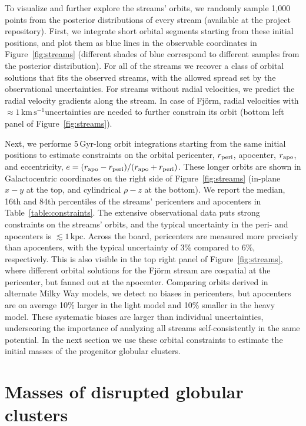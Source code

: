 \documentclass[twocolumn]{aastex63}
\newcommand{\kpc}{\ensuremath{\textrm{kpc}}}
\newcommand{\kms}{\ensuremath{\textrm{km}\,\textrm{s}^{-1}}}
\begin{document}
To visualize and further explore the streams' orbits, we randomly sample 1,000 points from the posterior distributions of every stream (available at the project repository).
First, we integrate short orbital segments starting from these initial positions, and plot them as blue lines in the observable coordinates in Figure~\ref{fig:streams} (different shades of blue correspond to different samples from the posterior distribution).
For all of the streams we recover a class of orbital solutions that fits the observed streams, with the allowed spread set by the observational uncertainties.
For streams without radial velocities, we predict the radial velocity gradients along the stream.
In case of Fj\" orm, radial velocities with $\approx1$\,\kms uncertainties are needed to further constrain its orbit (bottom left panel of Figure~\ref{fig:streams}).

Next, we performe 5\,Gyr-long orbit integrations starting from the same initial positions to estimate constraints on the orbital pericenter, $r_{\rm peri}$, apocenter, $r_{\rm apo}$, and eccentricity, $e=(r_{\rm apo} - r_{\rm peri})/(r_{\rm apo} + r_{\rm peri})$.
These longer orbits are shown in Galactocentric coordinates on the right side of Figure~\ref{fig:streams} (in-plane $x-y$ at the top, and cylindrical $\rho-z$ at the bottom).
We report the median, 16th and 84th percentiles of the streams' pericenters and apocenters in Table~\ref{table:constraints}.
The extensive observational data puts strong constraints on the streams' orbits, and the typical uncertainty in the peri- and apocenters is $\lesssim1\,\kpc$.
Across the board, pericenters are measured more precisely than apocenters, with the typical uncertainty of 3\% compared to 6\%, respectively.
This is also visible in the top right panel of Figure~\ref{fig:streams}, where different orbital solutions for the  Fj\" orm stream are cospatial at the pericenter, but fanned out at the apocenter.
Comparing orbits derived in alternate Milky Way models, we detect no biases in pericenters, but apocenters are on average 10\% larger in the light model and 10\% smaller in the heavy model.
These systematic biases are larger than individual uncertainties, underscoring the importance of analyzing all streams self-consistently in the same potential.
In the next section we use these orbital constraints to estimate the initial masses of the progenitor globular clusters.

\section{Masses of disrupted globular clusters}
\label{sec:disrupted}
\end{document}
